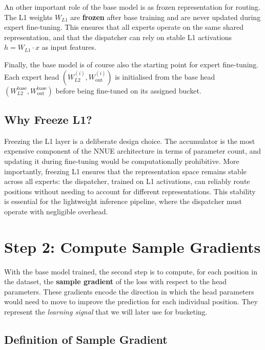 An other important role of the base model is as frozen representation for routing. The L1 weights \(W_{L1}\) are \textbf{frozen} after base training and are never updated during expert fine-tuning. This ensures that all experts operate on the same shared representation, and that the dispatcher can rely on stable L1 activations \(h = W_{L1} \cdot x\) as input features.

Finally, the base model is of course also the starting point for expert fine-tuning. Each expert head \((W_{L2}^{(i)}, W_{\mathrm{out}}^{(i)})\) is initialised from the base head \((W_{L2}^{\mathrm{base}}, W_{\mathrm{out}}^{\mathrm{base}})\) before being fine-tuned on its assigned bucket.

\subsection{Why Freeze L1?}\label{sec:why-freeze-l1}

Freezing the L1 layer is a deliberate design choice. The accumulator is the most expensive component of the NNUE architecture in terms of parameter count, and updating it during fine-tuning would be computationally prohibitive. More importantly, freezing L1 ensures that the representation space remains stable across all experts: the dispatcher, trained on L1 activations, can reliably route positions without needing to account for different representations. This stability is essential for the lightweight inference pipeline, where the dispatcher must operate with negligible overhead.

\section{Step 2: Compute Sample Gradients}\label{sec:step-gradients}

With the base model trained, the second step is to compute, for each position in the dataset, the \textbf{sample gradient} of the loss with respect to the head parameters. These gradients encode the direction in which the head parameters would need to move to improve the prediction for each individual position. They represent the \emph{learning signal} that we will later use for bucketing.

\subsection{Definition of Sample Gradient}\label{sec:sg-def}

